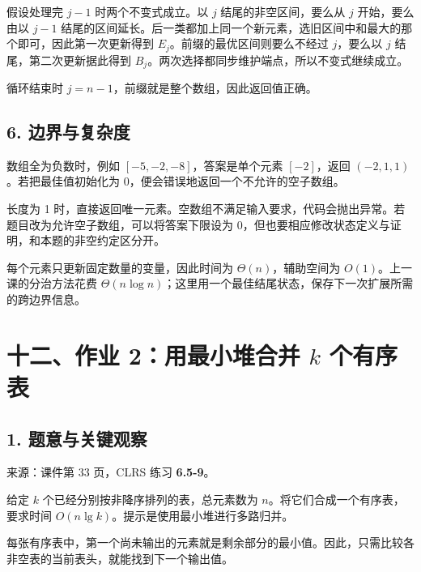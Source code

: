 \documentclass[
  UTF8,fontset=none,zihao=5]{ctexart}
\let\OldSection\section
\renewcommand{\section}{\Needspace{5\baselineskip}\OldSection}
\let\OldSubsection\subsection
\renewcommand{\subsection}{\Needspace{4\baselineskip}\OldSubsection}
\begin{document}
假设处理完 \(j-1\) 时两个不变式成立。以 \(j\) 结尾的非空区间，要么从
\(j\) 开始，要么由以 \(j-1\)
结尾的区间延长。后一类都加上同一个新元素，选旧区间中和最大的那个即可，因此第一次更新得到
\(E_j\)。前缀的最优区间则要么不经过 \(j\)，要么以 \(j\)
结尾，第二次更新据此得到
\(B_j\)。两次选择都同步维护端点，所以不变式继续成立。

循环结束时 \(j=n-1\)，前缀就是整个数组，因此返回值正确。

\hypertarget{ux8fb9ux754cux4e0eux590dux6742ux5ea6}{%
\subsection{6.
边界与复杂度}\label{ux8fb9ux754cux4e0eux590dux6742ux5ea6}}

数组全为负数时，例如 \([-5,-2,-8]\)，答案是单个元素 \([-2]\)，返回
\((-2,1,1)\)。若把最佳值初始化为 0，便会错误地返回一个不允许的空子数组。

长度为 1
时，直接返回唯一元素。空数组不满足输入要求，代码会抛出异常。若题目改为允许空子数组，可以将答案下限设为
0，但也要相应修改状态定义与证明，和本题的非空约定区分开。

每个元素只更新固定数量的变量，因此时间为 \(\Theta(n)\)，辅助空间为
\(O(1)\)。上一课的分治方法花费
\(\Theta(n\log n)\)；这里用一个最佳结尾状态，保存下一次扩展所需的跨边界信息。

\hypertarget{ux5341ux4e8cux4f5cux4e1a-2ux7528ux6700ux5c0fux5806ux5408ux5e76-k-ux4e2aux6709ux5e8fux8868}{%
\section{\texorpdfstring{十二、作业 2：用最小堆合并 \(k\)
个有序表}{十二、作业 2：用最小堆合并 k 个有序表}}\label{ux5341ux4e8cux4f5cux4e1a-2ux7528ux6700ux5c0fux5806ux5408ux5e76-k-ux4e2aux6709ux5e8fux8868}}

\hypertarget{ux9898ux610fux4e0eux5173ux952eux89c2ux5bdf}{%
\subsection{1.
题意与关键观察}\label{ux9898ux610fux4e0eux5173ux952eux89c2ux5bdf}}

来源：课件第 33 页，CLRS 练习 \textbf{6.5-9}。

给定 \(k\) 个已经分别按非降序排列的表，总元素数为
\(n\)。将它们合成一个有序表，要求时间
\(O(n\lg k)\)。提示是使用最小堆进行多路归并。

每张有序表中，第一个尚未输出的元素就是剩余部分的最小值。因此，只需比较各非空表的当前表头，就能找到下一个输出值。
\end{document}
